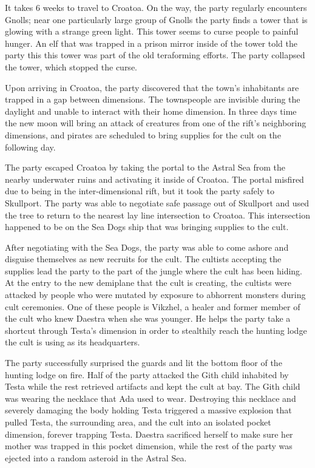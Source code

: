 It takes 6 weeks to travel to Croatoa.
On the way, the party regularly encounters Gnolls; near one particularly large group of Gnolls the party finds a tower that is glowing with a strange green light.
This tower seems to curse people to painful hunger.
An elf that was trapped in a prison mirror inside of the tower told the party this this tower was part of the old teraforming efforts.
The party collapsed the tower, which stopped the curse.

Upon arriving in Croatoa, the party discovered that the town's inhabitants are trapped in a gap between dimensions.
The townspeople are invisible during the daylight and unable to interact with their home dimension.
In three days time the new moon will bring an attack of creatures from one of the rift's neighboring dimensions, and pirates are scheduled to bring supplies for the cult on the following day.

The party escaped Croatoa by taking the portal to the Astral Sea from the nearby underwater ruins and activating it inside of Croatoa.
The portal misfired due to being in the inter-dimensional rift, but it took the party safely to Skullport.
The party was able to negotiate safe passage out of Skullport and used the tree to return to the nearest lay line intersection to Croatoa.
This intersection happened to be on the Sea Dogs ship that was bringing supplies to the cult.

After negotiating with the Sea Dogs, the party was able to come ashore and disguise themselves as new recruits for the cult.
The cultists accepting the supplies lead the party to the part of the jungle where the cult has been hiding.
At the entry to the new demiplane that the cult is creating, the cultists were attacked by people who were mutated by exposure to abhorrent monsters during cult ceremonies.
One of these people is Vikzhel, a healer and former member of the cult who knew Daestra when she was younger.
He helps the party take a shortcut through Testa's dimension in order to stealthily reach the hunting lodge the cult is using as its headquarters.

The party successfully surprised the guards and lit the bottom floor of the hunting lodge on fire.
Half of the party attacked the Gith child inhabited by Testa while the rest retrieved artifacts and kept the cult at bay.
The Gith child was wearing the necklace that Ada used to wear.
Destroying this necklace and severely damaging the body holding Testa triggered a massive explosion that pulled Testa, the surrounding area, and the cult into an isolated pocket dimension, forever trapping Testa.
Daestra sacrificed herself to make sure her mother was trapped in this pocket dimension, while the rest of the party was ejected into a random asteroid in the Astral Sea.

